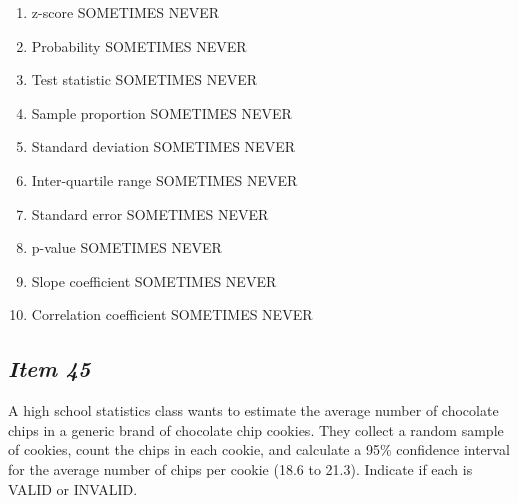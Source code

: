 \begin{enumerate} [leftmargin=1cm, itemsep=.2em]


\item z-score SOMETIMES NEVER


\item Probability SOMETIMES NEVER


\item Test statistic SOMETIMES NEVER


\item Sample proportion SOMETIMES NEVER


\item Standard deviation SOMETIMES NEVER


\item Inter-quartile range SOMETIMES NEVER


\item Standard error SOMETIMES NEVER


\item p-value SOMETIMES NEVER


\item Slope coefficient SOMETIMES NEVER


\item Correlation coefficient SOMETIMES NEVER


\end{enumerate}





\subsection{\textbf{\textit{Item 45}}}


A high school statistics class wants to estimate the average number of chocolate chips in a generic brand of chocolate chip cookies. They collect a random sample of cookies, count the chips in each cookie, and calculate a 95\% confidence interval for the average number of chips per cookie (18.6 to 21.3). Indicate if each is VALID or INVALID.




